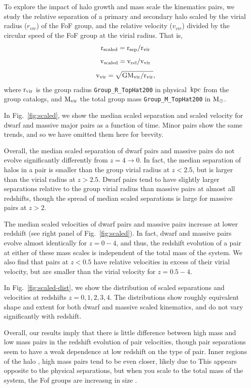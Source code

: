 \documentclass[twocolumn]{aastex631}
\newcommand{\scsep}{\ensuremath{\rm r_{sep}/r_{vir}}}
\newcommand{\scvel}{\ensuremath{\rm v_{rel}/v_{vir}}}
\begin{document}
    To explore the impact of halo growth and mass scale the kinematics pairs, we study the relative separation of a primary and secondary halo scaled by the virial radius ($r_{vir}$) of the FoF group, and the relative velocity ($v_{vir}$) divided by the circular speed of the FoF group at the virial radius. 
    That is, 
    $$\rm r_{scaled}=\scsep$$
    $$\rm v_{scaled}=\scvel$$
    $$\rm v_{vir}=\sqrt{G M_{vir}/r_{vir}},$$
    where $\rm r_{vir}$ is the group radius \texttt{Group\_R\_TopHat200} in physical $\mathrm{\,kpc}$ from the group catalogs, and $\rm M_{vir}$ the total group mass \texttt{Group\_M\_TopHat200} in $\mathrm{M}_\odot$.
    
    In Fig.~\ref{fig:scaled}, we show the median scaled separation and scaled velocity for dwarf and massive major pairs as a function of time. 
    Minor pairs show the same trends, and so we have omitted them here for brevity.
    
    Overall, the median scaled separation of dwarf pairs and massive pairs do not evolve significantly differently from $z=4\to0$.
    In fact, the median separation of halos in a pair is smaller than the group virial radius at $z<2.5$, but is larger than the virial radius at $z>2.5$.
    Dwarf pairs tend to have slightly larger separations relative to the group virial radius than massive pairs at almost all redshifts, though the spread of median scaled separations is large for massive pairs at $z>2$. 
    
    The median scaled velocities of dwarf pairs and massive pairs increase at lower redshift (see right panel of Fig.~\ref{fig:scaled}). In fact, dwarf and massive pairs evolve almost identically for $z=0-4$, and thus, the redshift evolution of a pair at either of these mass scales is independent of the total mass of the system. 
    We also find that pairs at $z<0.5$ have relative velocities in excess of their virial velocity, but are smaller than the virial velocity for $z=0.5-4$.
     
    In Fig.~\ref{fig:scaled-dist}, we show the distribution of scaled separations and velocities at redshifts $z=0,1,2,3,4$. 
    The distributions show roughly equivalent shape and extent for both dwarf and massive scaled kinematics, and do not vary significantly with redshift. 

    Overall, our results imply that there is little difference between high mass and low mass pairs in the redshift evolution of pair velocities, though pair separations seem to have a weak dependence at low redshift on the type of pair. Inner regions of the halo , high mass pairs tend to be even closer, likely due to 
    This appears opposite to the physical separations, but when you scale to the total mass of the system, the 
    Fof groups are increasng in size . \todo{}
    
\end{document}

